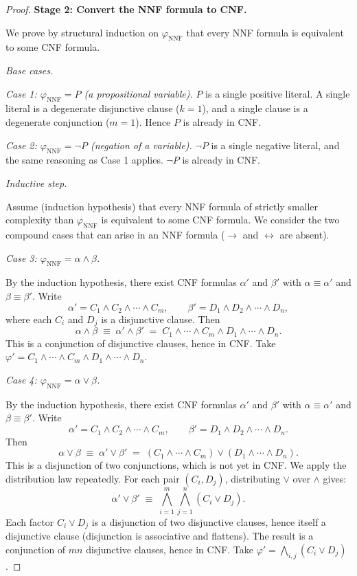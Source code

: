\begin{proof}
\medskip
\noindent\textbf{Stage 2: Convert the NNF formula to CNF.}

We prove by structural induction on $\varphi_{\mathrm{NNF}}$ that every NNF
formula is equivalent to some CNF formula.

\medskip
\noindent\textit{Base cases.}

\medskip
\textit{Case 1: $\varphi_{\mathrm{NNF}} = P$ (a propositional variable).}
$P$ is a single positive literal. A single literal is a degenerate disjunctive
clause ($k = 1$), and a single clause is a degenerate conjunction ($m = 1$).
Hence $P$ is already in CNF.

\medskip
\textit{Case 2: $\varphi_{\mathrm{NNF}} = \neg P$ (negation of a variable).}
$\neg P$ is a single negative literal, and the same reasoning as Case 1 applies.
$\neg P$ is already in CNF.

\medskip
\noindent\textit{Inductive step.}

Assume (induction hypothesis) that every NNF formula of strictly smaller
complexity than $\varphi_{\mathrm{NNF}}$ is equivalent to some CNF formula. We
consider the two compound cases that can arise in an NNF formula ($\rightarrow$
and $\leftrightarrow$ are absent).

\medskip
\textit{Case 3: $\varphi_{\mathrm{NNF}} = \alpha \wedge \beta$.}

By the induction hypothesis, there exist CNF formulas $\alpha'$ and $\beta'$
with $\alpha \equiv \alpha'$ and $\beta \equiv \beta'$. Write
\[
    \alpha' = C_1 \wedge C_2 \wedge \cdots \wedge C_m, \qquad
    \beta'  = D_1 \wedge D_2 \wedge \cdots \wedge D_n,
\]
where each $C_i$ and $D_j$ is a disjunctive clause. Then
\[
    \alpha \wedge \beta \;\equiv\; \alpha' \wedge \beta'
    \;=\; C_1 \wedge \cdots \wedge C_m \wedge D_1 \wedge \cdots \wedge D_n.
\]
This is a conjunction of disjunctive clauses, hence in CNF. Take $\varphi' =
C_1 \wedge \cdots \wedge C_m \wedge D_1 \wedge \cdots \wedge D_n$.

\medskip
\textit{Case 4: $\varphi_{\mathrm{NNF}} = \alpha \vee \beta$.}

By the induction hypothesis, there exist CNF formulas $\alpha'$ and $\beta'$
with $\alpha \equiv \alpha'$ and $\beta \equiv \beta'$. Write
\[
    \alpha' = C_1 \wedge C_2 \wedge \cdots \wedge C_m, \qquad
    \beta'  = D_1 \wedge D_2 \wedge \cdots \wedge D_n.
\]
Then
\[
    \alpha \vee \beta \;\equiv\; \alpha' \vee \beta'
    \;=\; (C_1 \wedge \cdots \wedge C_m) \vee (D_1 \wedge \cdots \wedge D_n).
\]
This is a disjunction of two conjunctions, which is not yet in CNF. We apply
the distribution law repeatedly. For each pair $(C_i, D_j)$, distributing
$\vee$ over $\wedge$ gives:
\[
    \alpha' \vee \beta' \;\equiv\;
    \bigwedge_{i=1}^{m} \bigwedge_{j=1}^{n} (C_i \vee D_j).
\]
Each factor $C_i \vee D_j$ is a disjunction of two disjunctive clauses, hence
itself a disjunctive clause (disjunction is associative and flattens). The
result is a conjunction of $mn$ disjunctive clauses, hence in CNF. Take
$\varphi' = \bigwedge_{i,j}(C_i \vee D_j)$.


\end{proof}
